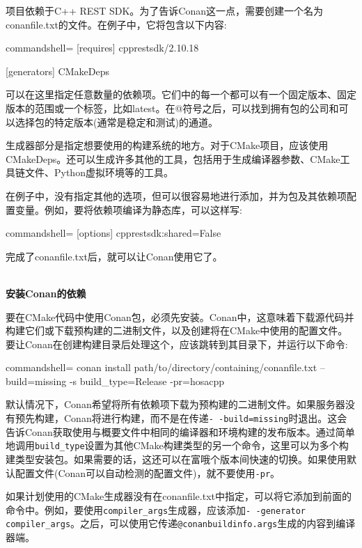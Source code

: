 项目依赖于C++ REST SDK。为了告诉Conan这一点，需要创建一个名为conanfile.txt的文件。在例子中，它将包含以下内容:

\begin{tcblisting}{commandshell={}}
[requires]
cpprestsdk/2.10.18

[generators]
CMakeDeps
\end{tcblisting}

可以在这里指定任意数量的依赖项。它们中的每一个都可以有一个固定版本、固定版本的范围或一个标签，比如latest。在@符号之后，可以找到拥有包的公司和可以选择包的特定版本(通常是稳定和测试)的通道。

生成器部分是指定想要使用的构建系统的地方。对于CMake项目，应该使用CMakeDeps。还可以生成许多其他的工具，包括用于生成编译器参数、CMake工具链文件、Python虚拟环境等的工具。

在例子中，没有指定其他的选项，但可以很容易地进行添加，并为包及其依赖项配置变量。例如，要将依赖项编译为静态库，可以这样写:

\begin{tcblisting}{commandshell={}}
[options]
cpprestsdk:shared=False
\end{tcblisting}

完成了conanfile.txt后，就可以让Conan使用它了。

\hspace*{\fill} \\ %
\noindent
\textbf{安装Conan的依赖}

要在CMake代码中使用Conan包，必须先安装。Conan中，这意味着下载源代码并构建它们或下载预构建的二进制文件，以及创建将在CMake中使用的配置文件。要让Conan在创建构建目录后处理这个，应该跳转到其目录下，并运行以下命令:

\begin{tcblisting}{commandshell={}}
conan install path/to/directory/containing/conanfile.txt --build=missing -s
build_type=Release -pr=hosacpp
\end{tcblisting}

默认情况下，Conan希望将所有依赖项下载为预构建的二进制文件。如果服务器没有预先构建，Conan将进行构建，而不是在传递\texttt{-\,-build=missing}时退出。这会告诉Conan获取使用与概要文件中相同的编译器和环境构建的发布版本。通过简单地调用\texttt{build\_type}设置为其他CMake构建类型的另一个命令，这里可以为多个构建类型安装包。如果需要的话，这还可以在富哦个版本间快速的切换。如果使用默认配置文件(Conan可以自动检测的配置文件)，就不要使用\texttt{-pr}。

如果计划使用的CMake生成器没有在conanfile.txt中指定，可以将它添加到前面的命令中。例如，要使用\texttt{compiler\_args}生成器，应该添加\texttt{-\,-generator compiler\_args}。之后，可以使用它传递\texttt{@conanbuildinfo.args}生成的内容到编译器端。

